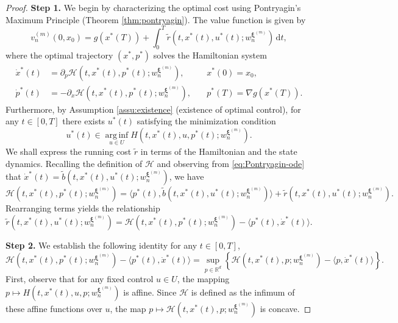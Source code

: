 \documentclass[11pt]{article}
\numberwithin{equation}{section}
\theoremstyle{plain}
\theoremstyle{definition}
\theoremstyle{remark}
\newcommand{\R}{\mathbb{R}}
\newcommand{\dd}{\mathrm{d}}
\begin{document}
\begin{proof}
{\bf Step 1.} We begin by characterizing the optimal cost using Pontryagin's Maximum Principle (Theorem \ref{thm:pontryagin}). The value function is given by 
\begin{equation} \label{eq:optimal-cost}
    v_n^{(m)}(0,x_0) = g(x^*(T)) + \int_0^T \tilde{r}(t,x^*(t), u^*(t);w_n^{\bm{\xi}^{(m)}})\,\dd t, 
\end{equation}
where the optimal trajectory $(x^*, p^*)$ solves the Hamiltonian system 
\begin{equation} \label{eq:Pontryagin-ode}
\begin{aligned}
    \dot{x}^*(t) &= \partial_p \mathcal{H}(t,x^*(t), p^*(t); w_n^{\bm{\xi}^{(m)}}), \quad &x^*(0) = x_0, \\
    \dot{p}^*(t) &= -\partial_x \mathcal{H}(t, x^*(t), p^*(t); w_n^{\bm{\xi}^{(m)}}), \quad &p^*(T) = \nabla g(x^*(T)). 
\end{aligned}
\end{equation}
Furthermore, by Assumption \ref{assu:existence} (existence of optimal control), for any $t\in [0,T]$ there exists $u^*(t)$ satisfying the minimization condition 
\begin{equation*}
    u^*(t) \in \operatorname*{arg\,inf}_{u\in U} H(t,x^*(t), u, p^*(t); w_n^{\bm{\xi}^{(m)}}).
\end{equation*}
We shall express the running cost $\tilde{r}$ in terms of the Hamiltonian and the state dynamics. 
Recalling the definition of $\mathcal{H}$ and observing from \eqref{eq:Pontryagin-ode} that $\dot{x}^*(t) = \tilde{b}(t,x^*(t), u^*(t); w_n^{\bm{\xi}^{(m)}})$, we have 
\begin{equation*}
    \mathcal{H}(t,x^*(t), p^*(t); w_n^{\bm{\xi}^{(m)}}) = \langle p^*(t), \tilde{b}(t,x^*(t), u^*(t); w_n^{\bm{\xi}^{(m)}})\rangle + \tilde{r}(t,x^*(t), u^*(t); w_n^{\bm{\xi}^{(m)}}). 
\end{equation*}
Rearranging terms yields the relationship 
\begin{equation} \label{eq:r-tilde-by-hamiltonian}
    \tilde{r}(t,x^*(t), u^*(t); w_n^{\bm{\xi}^{(m)}}) = \mathcal{H}(t,x^*(t), p^*(t); w_n^{\bm{\xi}^{(m)}}) - \langle p^*(t), \dot{x}^*(t) \rangle. 
\end{equation}

{\bf Step 2.} We establish the following identity for any $t\in [0,T]$, 
\begin{equation} \label{eq:equivalence-1}
    \mathcal{H}(t,x^*(t), p^*(t); w_n^{\bm{\xi}^{(m)}}) - \langle p^*(t), \dot{x}^*(t) \rangle = \sup_{p\in \R^d}\left\{ \mathcal{H}(t,x^*(t), p; w_n^{\bm{\xi}^{(m)}}) - \langle p, \dot{x}^*(t) \rangle \right\}.
\end{equation}
First, observe that for any fixed control $u\in U$, the mapping $p\mapsto H(t,x^*(t),u, p;w_n^{\bm{\xi}^{(m)}})$ is affine. Since $\mathcal{H}$ is defined as the infimum of these affine functions over $u$, the map $p\mapsto \mathcal{H}(t,x^*(t),p;w_n^{\bm{\xi}^{(m)}})$ is concave. 


\end{proof}
\end{document}
